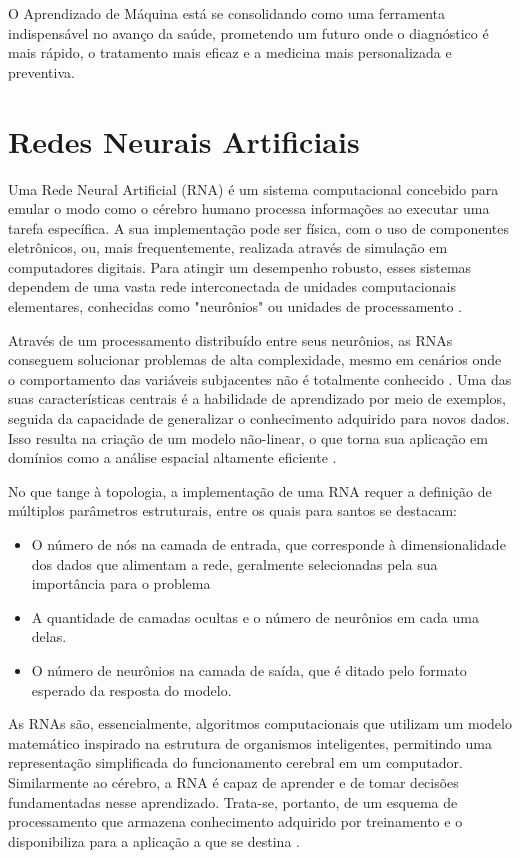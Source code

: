 O Aprendizado de Máquina está se consolidando como uma ferramenta indispensável no avanço da saúde, prometendo um futuro onde o diagnóstico é mais rápido, o tratamento mais eficaz e a medicina mais personalizada e preventiva.


\section{Redes Neurais Artificiais}
Uma Rede Neural Artificial (RNA) é um sistema computacional concebido para emular o modo como o cérebro humano processa informações ao executar uma tarefa específica. A sua implementação pode ser física, com o uso de componentes eletrônicos, ou, mais frequentemente, realizada através de simulação em computadores digitais. Para atingir um desempenho robusto, esses sistemas dependem de uma vasta rede interconectada de unidades computacionais elementares, conhecidas como "neurônios" ou unidades de processamento \cite{Haykin2009}.

Através de um processamento distribuído entre seus neurônios, as RNAs conseguem solucionar problemas de alta complexidade, mesmo em cenários onde o comportamento das variáveis subjacentes não é totalmente conhecido \cite{Busnardo2024}. Uma das suas características centrais é a habilidade de aprendizado por meio de exemplos, seguida da capacidade de generalizar o conhecimento adquirido para novos dados. Isso resulta na criação de um modelo não-linear, o que torna sua aplicação em domínios como a análise espacial altamente eficiente \cite{Sporl2011}.

No que tange à topologia, a implementação de uma RNA requer a definição de múltiplos parâmetros estruturais, entre os quais para santos\cite{Santos2005} se destacam: 
\begin{itemize}
	\item O número de nós na camada de entrada, que corresponde à dimensionalidade dos dados que alimentam a rede, geralmente selecionadas pela sua importância para o problema
	\item A quantidade de camadas ocultas e o número de neurônios em cada uma delas. 
	\item O número de neurônios na camada de saída, que é ditado pelo formato esperado da resposta do modelo.
\end{itemize}
As RNAs são, essencialmente, algoritmos computacionais que utilizam um modelo matemático inspirado na estrutura de organismos inteligentes, permitindo uma representação simplificada do funcionamento cerebral em um computador. Similarmente ao cérebro, a RNA é capaz de aprender e de tomar decisões fundamentadas nesse aprendizado. Trata-se, portanto, de um esquema de processamento que armazena conhecimento adquirido por treinamento e o disponibiliza para a aplicação a que se destina \cite{Sporl2011}.

